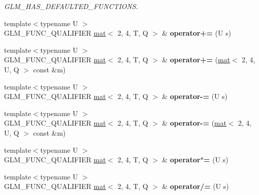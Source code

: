 \begin{DoxyCompactItemize}
\begin{DoxyCompactList}\small\item\em G\+L\+M\+\_\+\+H\+A\+S\+\_\+\+D\+E\+F\+A\+U\+L\+T\+E\+D\+\_\+\+F\+U\+N\+C\+T\+I\+O\+NS. \end{DoxyCompactList}\item 
\mbox{\label{structglm_1_1mat_3_012_00_014_00_01T_00_01Q_01_4_a2a7667a3e13a109fc7feef253654b9a7}} 
{\footnotesize template$<$typename U $>$ }\\G\+L\+M\+\_\+\+F\+U\+N\+C\+\_\+\+Q\+U\+A\+L\+I\+F\+I\+ER \hyperlink{structglm_1_1mat}{mat}$<$ 2, 4, T, Q $>$ \& {\bfseries operator+=} (U s)
\item 
\mbox{\label{structglm_1_1mat_3_012_00_014_00_01T_00_01Q_01_4_a44465daad3626301801fa9ebcf9f07d0}} 
{\footnotesize template$<$typename U $>$ }\\G\+L\+M\+\_\+\+F\+U\+N\+C\+\_\+\+Q\+U\+A\+L\+I\+F\+I\+ER \hyperlink{structglm_1_1mat}{mat}$<$ 2, 4, T, Q $>$ \& {\bfseries operator+=} (\hyperlink{structglm_1_1mat}{mat}$<$ 2, 4, U, Q $>$ const \&m)
\item 
\mbox{\label{structglm_1_1mat_3_012_00_014_00_01T_00_01Q_01_4_a341e3a7ac4ef80473285d574b8e86849}} 
{\footnotesize template$<$typename U $>$ }\\G\+L\+M\+\_\+\+F\+U\+N\+C\+\_\+\+Q\+U\+A\+L\+I\+F\+I\+ER \hyperlink{structglm_1_1mat}{mat}$<$ 2, 4, T, Q $>$ \& {\bfseries operator-\/=} (U s)
\item 
\mbox{\label{structglm_1_1mat_3_012_00_014_00_01T_00_01Q_01_4_adf8786e77c3b21c8436cd0b7aa921803}} 
{\footnotesize template$<$typename U $>$ }\\G\+L\+M\+\_\+\+F\+U\+N\+C\+\_\+\+Q\+U\+A\+L\+I\+F\+I\+ER \hyperlink{structglm_1_1mat}{mat}$<$ 2, 4, T, Q $>$ \& {\bfseries operator-\/=} (\hyperlink{structglm_1_1mat}{mat}$<$ 2, 4, U, Q $>$ const \&m)
\item 
\mbox{\label{structglm_1_1mat_3_012_00_014_00_01T_00_01Q_01_4_ac24896ac1bbba0ec89256b63209e4593}} 
{\footnotesize template$<$typename U $>$ }\\G\+L\+M\+\_\+\+F\+U\+N\+C\+\_\+\+Q\+U\+A\+L\+I\+F\+I\+ER \hyperlink{structglm_1_1mat}{mat}$<$ 2, 4, T, Q $>$ \& {\bfseries operator$\ast$=} (U s)
\item 
\mbox{\label{structglm_1_1mat_3_012_00_014_00_01T_00_01Q_01_4_af8635abf4f1d5f627b0d346d2c850911}} 
{\footnotesize template$<$typename U $>$ }\\G\+L\+M\+\_\+\+F\+U\+N\+C\+\_\+\+Q\+U\+A\+L\+I\+F\+I\+ER \hyperlink{structglm_1_1mat}{mat}$<$ 2, 4, T, Q $>$ \& {\bfseries operator/=} (U s)
\end{DoxyCompactItemize}
